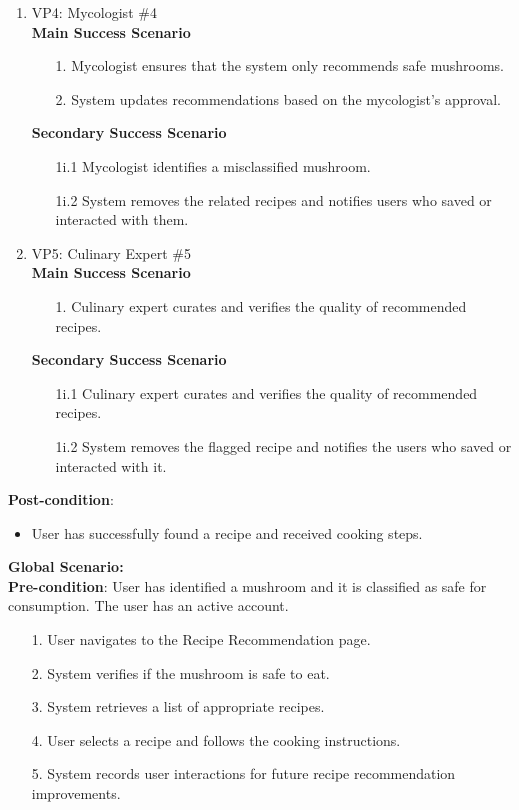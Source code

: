 \documentclass[]{article}
\begin{document}
\begin{enumerate}[{\bf BE1.}]
\begin{enumerate}[{\bf VP1.}]
			\item VP4: Mycologist \#4 \\
				\textbf{Main Success Scenario} 
			\begin{enumerate}
				\item[1.] Mycologist ensures that the system only recommends safe mushrooms.
					\item[2.] System updates recommendations based on the mycologist's approval.
			\end{enumerate}
				\textbf{Secondary Success Scenario}
				\begin{enumerate}
				\item[1i.1] Mycologist identifies a misclassified mushroom.
					\item[1i.2] System removes the related recipes and notifies users who saved or interacted with them.
				\end{enumerate}
			
			\item VP5: Culinary Expert \#5 \\
				\textbf{Main Success Scenario} 
			\begin{enumerate}
				\item[1.] Culinary expert curates and verifies the quality of recommended recipes.
			\end{enumerate}
				\textbf{Secondary Success Scenario} 
			\begin{enumerate}
				\item[1i.1] Culinary expert curates and verifies the quality of recommended recipes.
					\item[1i.2] System removes the flagged recipe and notifies the users who saved or interacted with it.
			\end{enumerate}                    
		\end{enumerate}
			
			\textbf{Post-condition}:  
			\begin{itemize}
				\item User has successfully found a recipe and received cooking steps.
			\end{itemize}
			
			\textbf{Global Scenario:} \\
				\textbf{Pre-condition}: User has identified a mushroom and it is classified as safe for consumption. The user has an active account.
			\begin{enumerate}
				\item[1.] User navigates to the Recipe Recommendation page.
				\item[2.] System verifies if the mushroom is safe to eat.
				\item[3.] System retrieves a list of appropriate recipes.
				\item[4.] User selects a recipe and follows the cooking instructions.
				\item[5.] System records user interactions for future recipe recommendation improvements.
			\end{enumerate}


\end{enumerate}
\end{document}

